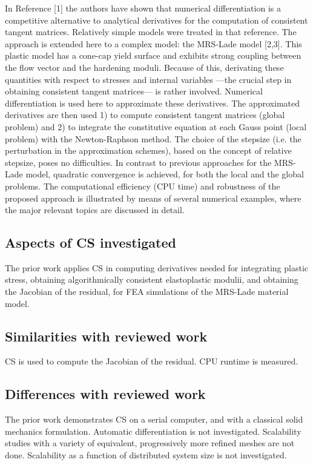 \documentclass[10pt,letterpaper,draft]{article}
\begin{document}
In Reference [1] the authors have shown that numerical differentiation is a
competitive alternative to analytical derivatives for the computation of
consistent tangent matrices. Relatively simple models were treated in that
reference. The approach is extended here to a complex model: the MRS-Lade model
[2,3]. This plastic model has a cone-cap yield surface and exhibits strong
coupling between the flow vector and the hardening moduli. Because of this,
derivating these quantities with respect to stresses and internal variables
—the crucial step in obtaining consistent tangent matrices— is rather involved.
Numerical differentiation is used here to approximate these derivatives. The
approximated derivatives are then used 1) to compute consistent tangent
matrices (global problem) and 2) to integrate the constitutive equation at each
Gauss point (local problem) with the Newton-Raphson method. The choice of the
stepsize (i.e. the perturbation in the approximation schemes), based on the
concept of relative stepsize, poses no difficulties. In contrast to previous
approaches for the MRS-Lade model, quadratic convergence is achieved, for both
the local and the global problems. The computational efficiency (CPU time) and
robustness of the proposed approach is illustrated by means of several
numerical examples, where the major relevant topics are discussed in detail.

\subsection{Aspects of CS investigated}

The prior work applies CS in computing derivatives needed for integrating
plastic stress, obtaining algorithmically consistent elastoplastic modulii, and
obtaining the Jacobian of the residual, for FEA simulations of the MRS-Lade material
model.

\subsection{Similarities with reviewed work}

CS is used to compute the Jacobian of the residual. CPU runtime is measured.

\subsection{Differences with reviewed work}

The prior work demonstrates CS on a serial computer, and with a classical solid
mechanics formulation. Automatic differentiation is not investigated.
Scalability studies with a variety of equivalent, progressively more refined
meshes are not done. Scalability as a function of distributed system size is
not investigated.
\end{document}
